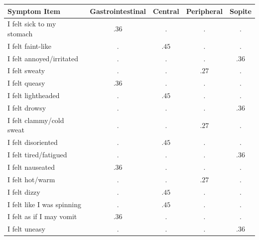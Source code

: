 \begin{center}
    \begin{tabular}{l c c c c}
        \toprule
        \textbf{Symptom Item} & \textbf{Gastrointestinal} & \textbf{Central} & \textbf{Peripheral} & \textbf{Sopite} \\
        \midrule
        I felt sick to my stomach  & $.36$ & $.$   & $.$   & $.$   \\
        I felt faint-like          & $.$   & $.45$ & $.$   & $.$   \\
        I felt annoyed/irritated   & $.$   & $.$   & $.$   & $.36$ \\
        I felt sweaty              & $.$   & $.$   & $.27$ & $.$   \\
        I felt queasy              & $.36$ & $.$   & $.$   & $.$   \\
        I felt lightheaded         & $.$   & $.45$ & $.$   & $.$   \\
        I felt drowsy              & $.$   & $.$   & $.$   & $.36$ \\
        I felt clammy/cold sweat   & $.$   & $.$   & $.27$ & $.$   \\
        I felt disoriented         & $.$   & $.45$ & $.$   & $.$   \\
        I felt tired/fatigued      & $.$   & $.$   & $.$   & $.36$ \\
        I felt nauseated           & $.36$ & $.$   & $.$   & $.$   \\
        I felt hot/warm            & $.$   & $.$   & $.27$ & $.$   \\
        I felt dizzy               & $.$   & $.45$ & $.$   & $.$   \\
        I felt like I was spinning & $.$   & $.45$ & $.$   & $.$   \\
        I felt as if I may vomit   & $.36$ & $.$   & $.$   & $.$   \\
        I felt uneasy              & $.$   & $.$   & $.$   & $.36$ \\
        \bottomrule
    \end{tabular}
    \label{tab:msaq-questions}
\end{center}

